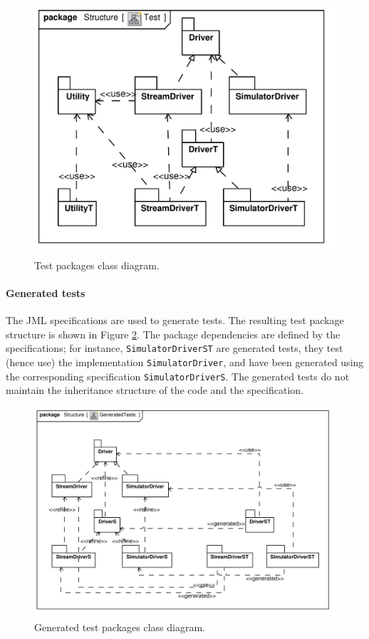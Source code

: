\documentclass[english]{lni}
\newcommand{\lil}[1]{\texttt{\lstinline|#1|}}
\begin{document}
\begin{figure}[htb!]
  \centering
  \includegraphics[scale=0.4]{UML_model/Class_Diagram__Structure__Test}
  \caption{Test packages class diagram.}
  \label{fig:class_diagram_test}
\end{figure}

\paragraph*{Generated tests}

The JML specifications are used to generate tests.
The resulting test package structure is shown in Figure \ref{fig:class_diagram_generatedtest}.  
The package dependencies are defined by the specifications; for instance, \lil{SimulatorDriverST} are generated tests, they test (hence use) the implementation \lil{SimulatorDriver}, and have been generated using the corresponding specification \lil{SimulatorDriverS}.  
The generated tests do not maintain the inheritance structure of the code and the specification.

\begin{figure}[htb!]
  \centering
  \includegraphics[scale=0.7]{UML_model/Class_Diagram__Structure__GeneratedTests}
  \caption{Generated test packages class diagram.}
  \label{fig:class_diagram_generatedtest}
\end{figure}
\end{document}
